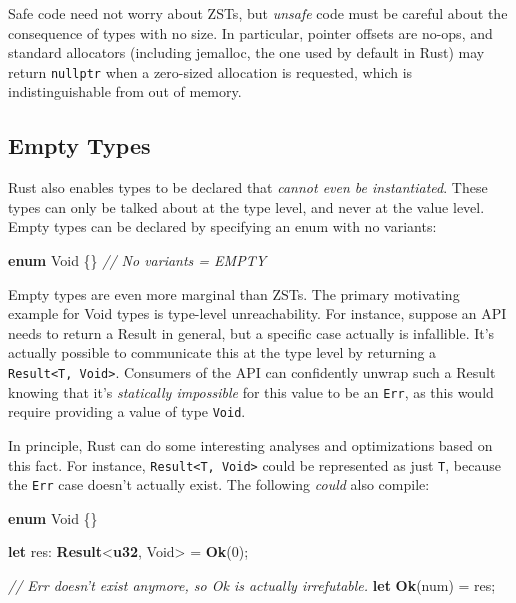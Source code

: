 \documentclass[a4paper,]{book}
\newenvironment{Shaded}{\begin{snugshade}}{\end{snugshade}}
\newcommand{\KeywordTok}[1]{\textcolor[rgb]{0.13,0.29,0.53}{\textbf{{#1}}}}
\newcommand{\DecValTok}[1]{\textcolor[rgb]{0.00,0.00,0.81}{{#1}}}
\newcommand{\CommentTok}[1]{\textcolor[rgb]{0.56,0.35,0.01}{\textit{{#1}}}}
\newcommand{\NormalTok}[1]{{#1}}
\begin{document}
Safe code need not worry about ZSTs, but \emph{unsafe} code must be
careful about the consequence of types with no size. In particular,
pointer offsets are no-ops, and standard allocators (including jemalloc,
the one used by default in Rust) may return \texttt{nullptr} when a
zero-sized allocation is requested, which is indistinguishable from out
of memory.

\subsection{Empty Types}\label{empty-types}

Rust also enables types to be declared that \emph{cannot even be
instantiated}. These types can only be talked about at the type level,
and never at the value level. Empty types can be declared by specifying
an enum with no variants:

\begin{Shaded}
\begin{Highlighting}[]
\KeywordTok{enum} \NormalTok{Void \{\} }\CommentTok{// No variants = EMPTY}
\end{Highlighting}
\end{Shaded}

Empty types are even more marginal than ZSTs. The primary motivating
example for Void types is type-level unreachability. For instance,
suppose an API needs to return a Result in general, but a specific case
actually is infallible. It's actually possible to communicate this at
the type level by returning a
\texttt{Result\textless{}T,\ Void\textgreater{}}. Consumers of the API
can confidently unwrap such a Result knowing that it's \emph{statically
impossible} for this value to be an \texttt{Err}, as this would require
providing a value of type \texttt{Void}.

In principle, Rust can do some interesting analyses and optimizations
based on this fact. For instance,
\texttt{Result\textless{}T,\ Void\textgreater{}} could be represented as
just \texttt{T}, because the \texttt{Err} case doesn't actually exist.
The following \emph{could} also compile:

\begin{Shaded}
\begin{Highlighting}[]
\KeywordTok{enum} \NormalTok{Void \{\}}

\KeywordTok{let} \NormalTok{res: }\KeywordTok{Result}\NormalTok{<}\KeywordTok{u32}\NormalTok{, Void> = }\KeywordTok{Ok}\NormalTok{(}\DecValTok{0}\NormalTok{);}

\CommentTok{// Err doesn't exist anymore, so Ok is actually irrefutable.}
\KeywordTok{let} \KeywordTok{Ok}\NormalTok{(num) = res;}
\end{Highlighting}
\end{Shaded}
\end{document}

